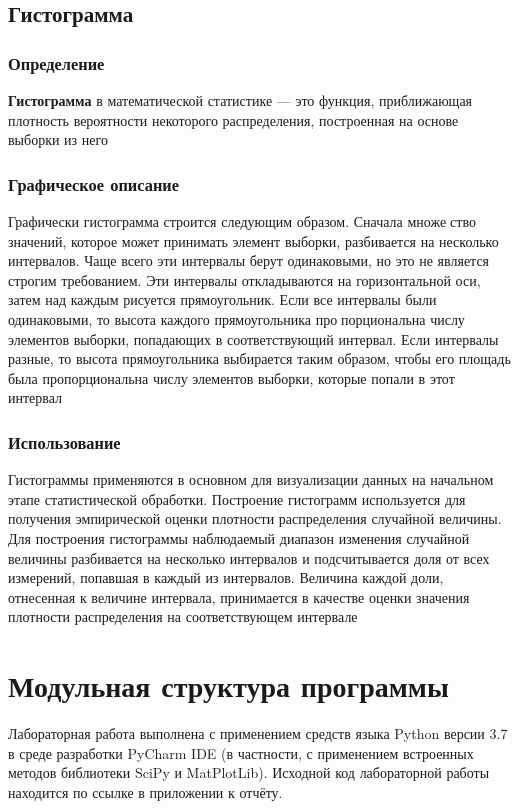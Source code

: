 \documentclass[a4paper]{article}
\begin{document}
    \subsection{Гистограмма}
        \subsubsection{Определение}
            \textbf{Гистограмма} в математической статистике — это функция, приближающая
    плотность вероятности некоторого распределения, построенная на основе
    выборки из него
        \subsubsection{Графическое описание}
            Графически гистограмма строится следующим образом. Сначала множество значений, которое может принимать элемент выборки, разбивается на
    несколько интервалов. Чаще всего эти интервалы берут одинаковыми, но
    это не является строгим требованием. Эти интервалы откладываются на
    горизонтальной оси, затем над каждым рисуется прямоугольник. Если все
    интервалы были одинаковыми, то высота каждого прямоугольника пропорциональна числу элементов выборки, попадающих в соответствующий интервал. Если интервалы разные, то высота прямоугольника выбирается
    таким образом, чтобы его площадь была пропорциональна числу элементов
    выборки, которые попали в этот интервал
        \subsubsection{Использование}
            Гистограммы применяются в основном для визуализации данных на начальном этапе статистической обработки.
    Построение гистограмм используется для получения эмпирической оценки
    плотности распределения случайной величины. Для построения гистограммы наблюдаемый диапазон изменения случайной величины разбивается на
    несколько интервалов и подсчитывается доля от всех измерений, попавшая
    в каждый из интервалов. Величина каждой доли, отнесенная к величине
    интервала, принимается в качестве оценки значения плотности распределения на соответствующем интервале
\section{Модульная структура программы}
Лабораторная работа выполнена с применением средств языка Python версии 3.7 в среде разработки PyCharm IDE (в частности, с применением встроенных методов библиотеки SciPy и MatPlotLib). Исходной код лабораторной работы находится по ссылке в приложении к отчёту.
\end{document}
